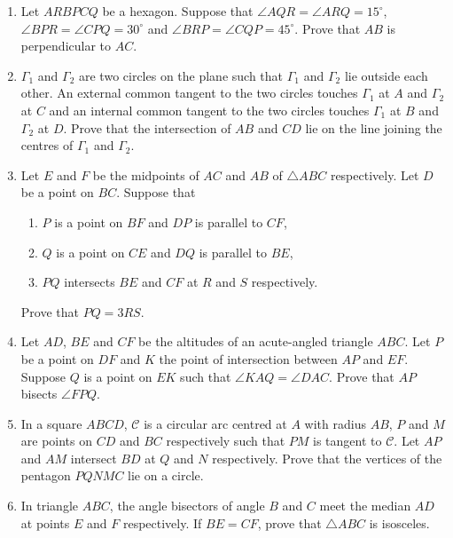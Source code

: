 \documentclass[12pt]{scrartcl}
\begin{document}
\begin{enumerate}[resume]


    \item Let $ARBPCQ$ be a hexagon. Suppose that $\angle AQR=\angle ARQ=15^{\circ}$, $\angle BPR=\angle CPQ=30^{\circ}$ and $\angle BRP=\angle CQP=45^{\circ}$. Prove that $AB$ is perpendicular to $AC$.

    \item $\Gamma_{1}$ and $\Gamma_{2}$ are two circles on the plane such that $\Gamma_{1}$ and $\Gamma_{2}$ lie outside each other. An external common tangent to the two circles touches $\Gamma_{1}$ at $A$ and $\Gamma_{2}$ at $C$ and an internal common tangent to the two circles touches $\Gamma_{1}$ at $B$ and $\Gamma_{2}$ at $D$. Prove that the intersection of $AB$ and $CD$ lie on the line joining the centres of $\Gamma_{1}$ and $\Gamma_{2}$.

    \item Let $E$ and $F$ be the midpoints of $AC$ and $AB$ of $\triangle ABC$ respectively. Let $D$ be a point on $BC$. Suppose that
    \begin{enumerate}
        \item[(i)] $P$ is a point on $BF$ and $DP$ is parallel to $CF$,
        \item[(ii)] $Q$ is a point on $CE$ and $DQ$ is parallel to $BE$,
        \item[(iii)] $PQ$ intersects $BE$ and $CF$ at $R$ and $S$ respectively.
    \end{enumerate}
    Prove that $PQ=3RS.$

    \item Let $AD$, $BE$ and $CF$ be the altitudes of an acute-angled triangle $ABC$. Let $P$ be a point on $DF$ and $K$ the point of intersection between $AP$ and $EF$. Suppose $Q$ is a point on $EK$ such that $\angle KAQ=\angle DAC$. Prove that $AP$ bisects $\angle FPQ$.

    \item In a square $ABCD$, $\mathcal{C}$ is a circular arc centred at $A$ with radius $AB$, $P$ and $M$ are points on $CD$ and $BC$ respectively such that $PM$ is tangent to $\mathcal{C}$. Let $AP$ and $AM$ intersect $BD$ at $Q$ and $N$ respectively. Prove that the vertices of the pentagon $PQNMC$ lie on a circle.

    \item In triangle $ABC$, the angle bisectors of angle $B$ and $C$ meet the median $AD$ at points $E$ and $F$ respectively. If $BE=CF$, prove that $\triangle ABC$ is isosceles.


\end{enumerate}
\end{document}
